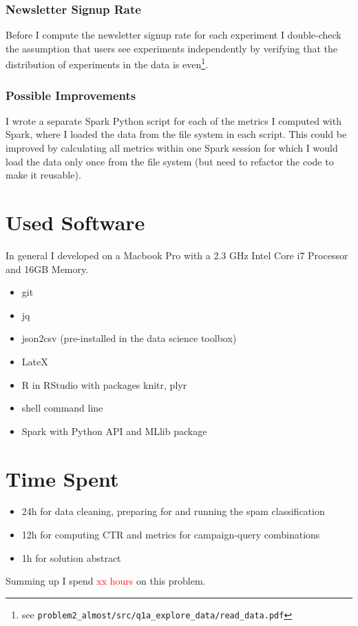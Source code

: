 \documentclass{article}\usepackage[]{graphicx}\usepackage[]{color}
\begin{document}
\subsubsection{Newsletter Signup Rate} %
\label{subsub:signup}

Before I compute the newsletter signup rate for each experiment I double-check the assumption that users see experiments independently by verifying that the distribution of experiments in the data is even\footnote{see \verb+problem2_almost/src/q1a_explore_data/read_data.pdf+}.



\subsubsection{Possible Improvements} %
\label{subsub:improvements}

I wrote a separate Spark Python script for each of the metrics I computed with Spark, where I loaded the data from the file system in each script. This could be improved by calculating all metrics within one Spark session for which I would load the data only once from the file system (but need to refactor the code to make it reusable). 




\section{Used Software}
\label{used_software}
In general I developed on a Macbook Pro with a 2.3 GHz Intel Core i7 Processor and 16GB Memory.

\begin{itemize}
	\item git
	\item jq
	\item json2csv (pre-installed in the data science toolbox)
	\item LateX
	\item R in RStudio with packages knitr, plyr
	\item shell command line
	\item Spark with Python API and MLlib package
\end{itemize}

\section{Time Spent}
\begin{itemize}
	\item 24h for data cleaning, preparing for and running the spam classification
	\item 12h for computing CTR and metrics for campaign-query combinations
	\item 1h for solution abstract
\end{itemize}

Summing up I spend \textcolor{red}{xx hours} on this problem.
\end{document}
